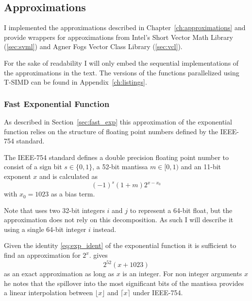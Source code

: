 \documentclass[a4paper, 11pt]{memoir}
\begin{document}

    \subsection{Approximations}
    \label{sec:impl_approx}
    I implemented the approximations described in Chapter~\ref{ch:approximations} and provide wrappers for
    approximations from Intel's Short Vector Math Library (\ref{sec:svml}) and Agner Fogs Vector Class Library
    (\ref{sec:vcl}).

    For the sake of readability I will only embed the sequential implementations of the approximations in the text. The
    versions of the functions parallelized using T-SIMD can be found in Appendix~\ref{ch:listings}.

    \subsubsection{Fast Exponential Function}
    \label{sec:impl_fast_exp}
    As described in Section~\ref{sec:fast_exp} this approximation of the exponential function relies on the structure of
    floating point numbers defined by the IEEE-754 standard.

    The IEEE-754 standard defines a double precision floating point number to consist of a sign bit $s \in \{ 0, 1 \}$,
    a 52-bit mantissa $m \in [0, 1)$ and an 11-bit exponent $x$ and is calculated as
    \begin{equation}
        (-1)^s (1 + m) 2^{x - x_0}
        \label{eq:def_ieee754}
    \end{equation}
    with $x_0 = 1023$ as a bias term.

    Note that \citeauthor{fast_exp} uses two 32-bit integers $i$ and $j$ to represent a 64-bit float, but the
    approximation does not rely on this decomposition. As such I will describe it using a single 64-bit integer $i$ instead.

    Given the identity \eqref{eq:exp_ident} of the exponential function it is sufficient to find an approximation for
    $2^x$. \citeauthor{fast_exp} gives
    \begin{equation}
        2^{52}(x + 1023)
    \end{equation}
    as an exact approximation as long as $x$ is an integer. For non integer arguments $x$ he notes that the spillover into
    the most significant bits of the mantissa provides a linear interpolation between $\lfloor x \rfloor$ and $\lceil x
    \rceil$ under IEEE-754.
\end{document}
